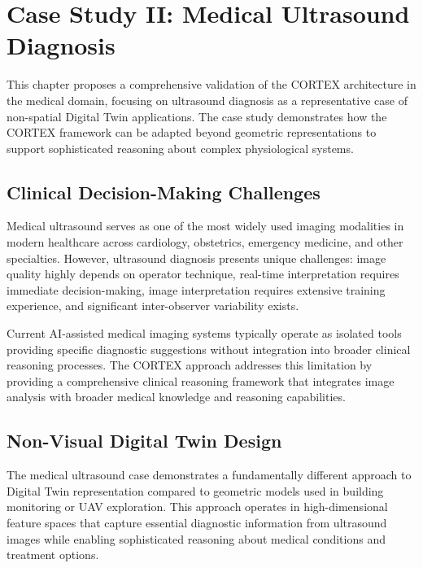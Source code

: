 
\chapter{Case Study II: Medical Ultrasound Diagnosis} \label{chp:medical}

This chapter proposes a comprehensive validation of the CORTEX architecture in the medical domain, focusing on ultrasound diagnosis as a representative case of non-spatial Digital Twin applications. The case study demonstrates how the CORTEX framework can be adapted beyond geometric representations to support sophisticated reasoning about complex physiological systems.

\section{Clinical Decision-Making Challenges}

Medical ultrasound serves as one of the most widely used imaging modalities in modern healthcare across cardiology, obstetrics, emergency medicine, and other specialties. However, ultrasound diagnosis presents unique challenges: image quality highly depends on operator technique, real-time interpretation requires immediate decision-making, image interpretation requires extensive training experience, and significant inter-observer variability exists.

Current AI-assisted medical imaging systems typically operate as isolated tools providing specific diagnostic suggestions without integration into broader clinical reasoning processes. The CORTEX approach addresses this limitation by providing a comprehensive clinical reasoning framework that integrates image analysis with broader medical knowledge and reasoning capabilities.

\section{Non-Visual Digital Twin Design}

The medical ultrasound case demonstrates a fundamentally different approach to Digital Twin representation compared to geometric models used in building monitoring or UAV exploration. This approach operates in high-dimensional feature spaces that capture essential diagnostic information from ultrasound images while enabling sophisticated reasoning about medical conditions and treatment options.

